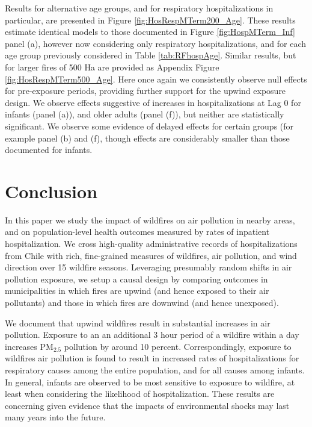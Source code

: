 \documentclass[11pt]{article}
\begin{document}
\begin{spacing}{1.5}
Results for alternative age groups, and for respiratory hospitalizations in particular, are presented in Figure \ref{fig:HosRespMTerm200_Age}.  These results estimate identical models to those documented in Figure \ref{fig:HospMTerm_Inf} panel (a), however now considering only respiratory hospitalizations, and for each age group previously considered in Table \ref{tab:RFhospAge}.  Similar results, but for larger fires of 500 Ha are provided as Appendix Figure \ref{fig:HosRespMTerm500_Age}. 
Here once again we consistently observe null effects for pre-exposure periods, providing further support for the upwind exposure design.  We observe effects suggestive of increases in hospitalizations at Lag 0 for infants (panel (a)), and older adults (panel (f)), but neither are statistically significant.  We observe some evidence of delayed effects for certain groups (for example panel (b) and (f), though effects are considerably smaller than those documented for infants.

\clearpage

\section{Conclusion}
\label{scn:conclusion}
In this paper we study the impact of wildfires on air pollution in nearby areas, and on population-level health outcomes measured by rates of inpatient hospitalization.  We cross high-quality administrative records of hospitalizations from Chile with rich, fine-grained measures of wildfires, air pollution, and wind direction over 15 wildfire seasons. Leveraging presumably random shifts in air pollution exposure, we setup a causal design by comparing outcomes in municipalities in which fires are upwind (and hence exposed to their air pollutants) and those in which fires are downwind (and hence unexposed).

We document that upwind wildfires result in substantial increases in air pollution.  Exposure to an an additional 3 hour period of a wildfire within a day increases PM$_{2.5}$  pollution by around 10 percent.  Correspondingly, exposure to wildfires air pollution is found to result in increased rates of hospitalizations for respiratory causes among the entire population, and for all causes among infants.  In general, infants are observed to be most sensitive to exposure to wildfire, at least when considering the likelihood of hospitalization.  These results are concerning given evidence that the impacts of environmental shocks may last many years into the future.  


\end{spacing}
\end{document}
